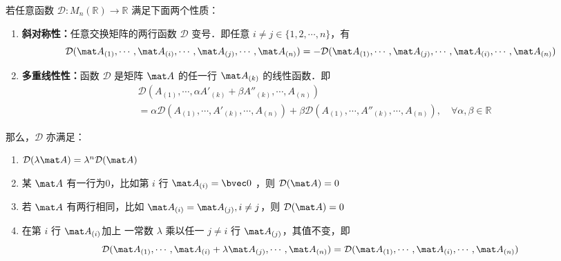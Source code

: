 \begin{lemma}{}
若任意函数 $\mathcal D:M_n(\mathbb R)\rightarrow \mathbb R$ 满足下面两个性质：
\begin{enumerate}
\item \textbf{斜对称性：}任意交换矩阵的两行函数 $\mathcal D$ 变号．即任意 $i\neq j\in \{1,2,\cdots,n\}$，有
\begin{equation}
\mathcal D(\mat A_{(1)},\cdots,\mat A_{(i)},\cdots,\mat A_{(j)},\cdots,\mat A_{(n)})=-\mathcal D(\mat A_{(1)},\cdots,\mat A_{(j)},\cdots,\mat A_{(i)},\cdots,\mat A_{(n)})
\end{equation}
\item \textbf{多重线性性：}函数 $\mathcal D$ 是矩阵 $\mat A$ 的任一行 $\mat A_{(k)}$ 的线性函数．即
\begin{equation}
\begin{aligned}
&\mathcal D(A_{(1)},\cdots,\alpha A'_{(k)}+\beta A''_{(k)},\cdots,A_{(n)})\\
&=\alpha\mathcal D(A_{(1)},\cdots,A'_{(k)},\cdots,A_{(n)})+\beta\mathcal D(A_{(1)},\cdots,A''_{(k)},\cdots,A_{(n)}),\quad\forall\alpha,\beta\in\mathbb R
\end{aligned}
\end{equation}
\end{enumerate}
那么，$\mathcal D$ 亦满足：
\begin{enumerate}
\item $\mathcal D(\lambda\mat A)=\lambda^n\mathcal D(\mat A)$
\item 某 $\mat A$ 有一行为0，比如第 $i$ 行 $\mat A_{(i)}=\bvec 0$ ，则 $\mathcal D(\mat A)=0$
\item 若 $\mat A$ 有两行相同，比如 $\mat A_{(i)}=\mat A_{(j)},i\neq j$，则 $\mathcal D(\mat A)=0$
\item 在第 $i$ 行 $\mat A_{(i)}$加上 一常数 $\lambda$ 乘以任一 $j\neq i$ 行 $\mat A_{(j)}$，其值不变，即
\begin{equation}
\mathcal D(\mat A_{(1)},\cdots,\mat A_{(i)}+\lambda \mat A_{(j)},\cdots,\mat A_{(n)})=\mathcal D(\mat A_{(1)},\cdots,\mat A_{(i)},\cdots,\mat A_{(n)})
\end{equation}

\end{enumerate}

\end{lemma}
